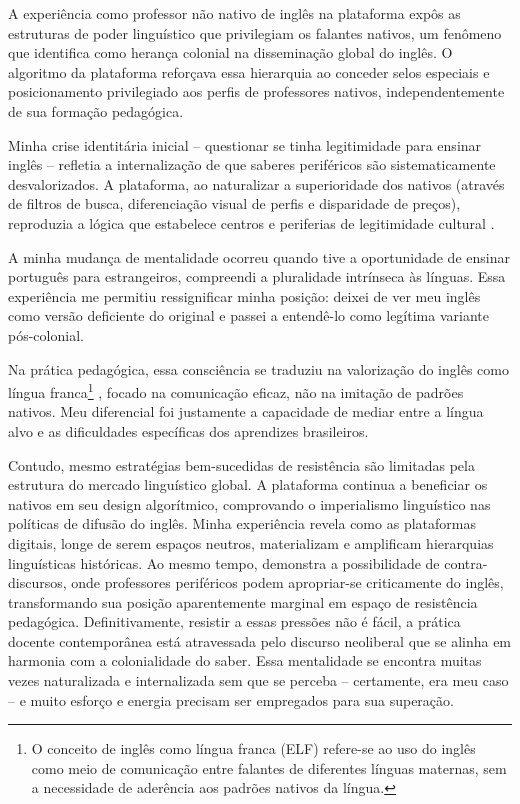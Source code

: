 \documentclass[portuguese]{textolivre}
\begin{document}
A experiência como professor não nativo de inglês na plataforma expôs as estruturas de poder linguístico que privilegiam os falantes nativos, um fenômeno que \textcite{pennycook1998} identifica como herança colonial na disseminação global do inglês. O algoritmo da plataforma reforçava essa hierarquia ao conceder selos especiais e posicionamento privilegiado aos perfis de professores nativos, independentemente de sua formação pedagógica.

Minha crise identitária inicial -- questionar se tinha legitimidade para ensinar inglês -- refletia a internalização de que saberes periféricos são sistematicamente desvalorizados. A plataforma, ao naturalizar a superioridade dos nativos (através de filtros de busca, diferenciação visual de perfis e disparidade de preços), reproduzia a lógica que estabelece centros e periferias de legitimidade cultural \cite{mignolo2005, lander2005}.

A minha mudança de mentalidade ocorreu quando tive a oportunidade de ensinar português para estrangeiros, compreendi a pluralidade intrínseca às línguas. Essa experiência me permitiu ressignificar minha posição: deixei de ver meu inglês como versão deficiente do original e passei a entendê-lo como legítima variante pós-colonial.

Na prática pedagógica, essa consciência se traduziu na valorização do inglês como língua franca\footnote{O conceito de inglês como língua franca (ELF) refere-se ao uso do inglês como meio de comunicação entre falantes de diferentes línguas maternas, sem a necessidade de aderência aos padrões nativos da língua.} \cite{jenkins2007}, focado na comunicação eficaz, não na imitação de padrões nativos. Meu diferencial foi justamente a capacidade de mediar entre a língua alvo e as dificuldades específicas dos aprendizes brasileiros.

Contudo, mesmo estratégias bem-sucedidas de resistência são limitadas pela estrutura do mercado linguístico global. A plataforma continua a beneficiar os nativos em seu design algorítmico, comprovando o imperialismo linguístico nas políticas de difusão do inglês. Minha experiência revela como as plataformas digitais, longe de serem espaços neutros, materializam e amplificam hierarquias linguísticas históricas. Ao mesmo tempo, demonstra a possibilidade de contra-discursos, onde professores periféricos podem apropriar-se criticamente do inglês, transformando sua posição aparentemente marginal em espaço de resistência pedagógica. Definitivamente, resistir a essas pressões não é fácil, a prática docente contemporânea está atravessada pelo discurso neoliberal que se alinha em harmonia com a colonialidade do saber. Essa mentalidade se encontra muitas vezes naturalizada e internalizada sem que se perceba -- certamente, era meu caso -- e muito esforço e energia precisam ser empregados para sua superação.
\end{document}
